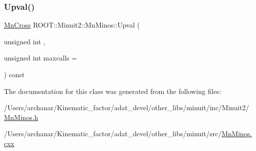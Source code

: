 \subsubsection{\texorpdfstring{Upval()}{Upval()}\hspace{0.1cm}{\footnotesize\ttfamily [2/2]}}
{\footnotesize\ttfamily \mbox{\hyperlink{classROOT_1_1Minuit2_1_1MnCross}{Mn\+Cross}} R\+O\+O\+T\+::\+Minuit2\+::\+Mn\+Minos\+::\+Upval (\begin{DoxyParamCaption}\item[{unsigned int}]{,  }\item[{unsigned int}]{maxcalls = {} }\end{DoxyParamCaption}) const}



The documentation for this class was generated from the following files\+:\begin{DoxyCompactItemize}
\item 
/\+Users/archanar/\+Kinematic\+\_\+factor/adat\+\_\+devel/other\+\_\+libs/minuit/inc/\+Minuit2/\mbox{\hyperlink{other__libs_2minuit_2inc_2Minuit2_2MnMinos_8h}{Mn\+Minos.\+h}}\item 
/\+Users/archanar/\+Kinematic\+\_\+factor/adat\+\_\+devel/other\+\_\+libs/minuit/src/\mbox{\hyperlink{MnMinos_8cxx}{Mn\+Minos.\+cxx}}\end{DoxyCompactItemize}

